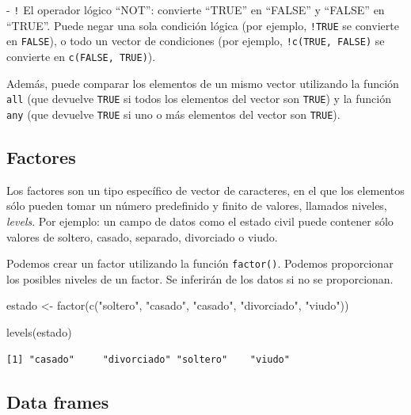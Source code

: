 \documentclass[
  letterpaper,
  DIV=11,
  numbers=noendperiod]{scrreprt}
\newenvironment{Shaded}{\begin{snugshade}}{\end{snugshade}}
\newcommand{\FunctionTok}[1]{\textcolor[rgb]{0.28,0.35,0.67}{#1}}
\newcommand{\NormalTok}[1]{\textcolor[rgb]{0.00,0.23,0.31}{#1}}
\newcommand{\OtherTok}[1]{\textcolor[rgb]{0.00,0.23,0.31}{#1}}
\newcommand{\StringTok}[1]{\textcolor[rgb]{0.13,0.47,0.30}{#1}}
\begin{document}
- \texttt{!} El operador lógico ``NOT'': convierte ``TRUE'' en ``FALSE''
y ``FALSE'' en ``TRUE''. Puede negar una sola condición lógica (por
ejemplo, \texttt{!TRUE} se convierte en \texttt{FALSE}), o todo un
vector de condiciones (por ejemplo, \texttt{!c(TRUE,\ FALSE)} se
convierte en \texttt{c(FALSE,\ TRUE)}).

Además, puede comparar los elementos de un mismo vector utilizando la
función \texttt{all} (que devuelve \texttt{TRUE} si todos los elementos
del vector son \texttt{TRUE}) y la función \texttt{any} (que devuelve
\texttt{TRUE} si uno o más elementos del vector son \texttt{TRUE}).

\hypertarget{factores}{%
\subsection{Factores}\label{factores}}

Los factores son un tipo específico de vector de caracteres, en el que
los elementos sólo pueden tomar un número predefinido y finito de
valores, llamados niveles, \emph{levels}. Por ejemplo: un campo de datos
como el estado civil puede contener sólo valores de soltero, casado,
separado, divorciado o viudo.

Podemos crear un factor utilizando la función \texttt{factor()}. Podemos
proporcionar los posibles niveles de un factor. Se inferirán de los
datos si no se proporcionan.

\begin{Shaded}
\begin{Highlighting}[]
\NormalTok{estado }\OtherTok{\textless{}{-}} \FunctionTok{factor}\NormalTok{(}\FunctionTok{c}\NormalTok{(}\StringTok{"soltero"}\NormalTok{, }\StringTok{"casado"}\NormalTok{, }\StringTok{"casado"}\NormalTok{, }\StringTok{"divorciado"}\NormalTok{, }\StringTok{"viudo"}\NormalTok{))}

\FunctionTok{levels}\NormalTok{(estado)}
\end{Highlighting}
\end{Shaded}

\begin{verbatim}
[1] "casado"     "divorciado" "soltero"    "viudo"     
\end{verbatim}

\hypertarget{data-frames}{%
\subsection{Data frames}\label{data-frames}}
\end{document}
